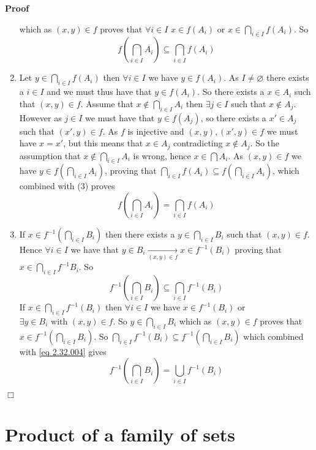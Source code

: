\documentclass{book}
\newcommand{\Rightarrowlim}{\mathop{\rightarrow}\limits}
\newcommand{\nin}{\not\in}
\newenvironment{proof}{\noindent\textbf{Proof\ }}{\hspace*{\fill}$\Box$\medskip}
\begin{document}
\begin{proof}
\begin{enumerate}
    which as $(x, y) \in f$ proves that $\forall i \in I$ $x \in f (A_i)$ or
    $x \in \bigcap_{i \in I} f (A_i)$. So
    \[ f \left( \bigcap_{i \in I} A_i \right) \subseteq \bigcap_{i \in I} f
       (A_i) \]
    \item Let $y \in \bigcap_{i \in I} f (A_i)$ then $\forall i \in I$ we have
    $y \in f (A_i)$. As $I \neq \varnothing$ there exists a $i \in I$ and we
    must thus have that $y \in f (A_i)$. So there exists a $x \in A_i$ such
    that $(x, y) \in f$. Assume that $x \nin \bigcap_{i \in I} A_i$ then
    $\exists j \in I$ such that $x \nin A_j$. However as $j \in I$ we must
    have that $y \in f (A_j)$, so there exists a $x' \in A_j$ such that $(x',
    y) \in f$. As $f$ is injective and $(x, y), (x', y) \in f$ we must have $x
    = x'$, but this means that $x \in A_j$ contradicting $x \nin A_j$. So the
    assumption that $x \nin \bigcap_{i \in I} A_i$ is wrong, hence $x \in
    \bigcap A_i$. As $(x, y) \in f$ we have $y \in f \left( \bigcap_{i \in I}
    A_i \right)$, proving that $\bigcap_{i \in I} f (A_i) \subseteq f \left(
    \bigcap_{i \in I} A_i \right)$, which combined with (3) proves
    \[ f \left( \bigcap_{i \in I} A_i \right) = \bigcap_{i \in I} f (A_i) \]
    \item If $x \in f^{- 1} \left( \bigcap_{i \in I} B_i \right)$ then there
    exists a $y \in \bigcap_{i \in I} B_i$ such that $(x, y) \in f$. Hence
    $\forall i \in I$ we have that $y \in B_i \Rightarrowlim_{(x, y) \in f} x
    \in f^{- 1} (B_i)$ proving that $x \in \bigcap_{i \in I} f^{- 1} B_i$. So
    \begin{equation}
      \label{eq 2.32.004} f^{- 1} \left( \bigcap_{i \in I} B_i \right)
      \subseteq \bigcap_{i \in I} f^{- 1} (B_i)
    \end{equation}
    If $x \in \bigcap_{i \in I} f^{- 1} (B_i)$ then $\forall i \in I$ we have
    $x \in f^{- 1} (B_i)$ or $\exists y \in B_i \text{ with } (x, y) \in f$.
    So $y \in \bigcap_{i \in I} B_i$ which as $(x, y) \in f$ proves that $x
    \in f^{- 1} \left( \bigcap_{i \in I} B_i \right)$. So $\bigcap_{i \in I}
    f^{- 1} (B_i) \subseteq f^{- 1} \left( \bigcap_{i \in I} B_i \right)$
    which combined with \ref{eq 2.32.004} gives
    \[ f^{- 1} \left( \bigcap_{i \in I} B_i \right) = \bigcup_{i \in I} f^{-
       1} (B_i) \]
  \end{enumerate}
\end{proof}

\section{Product of a family of sets}
\end{document}
